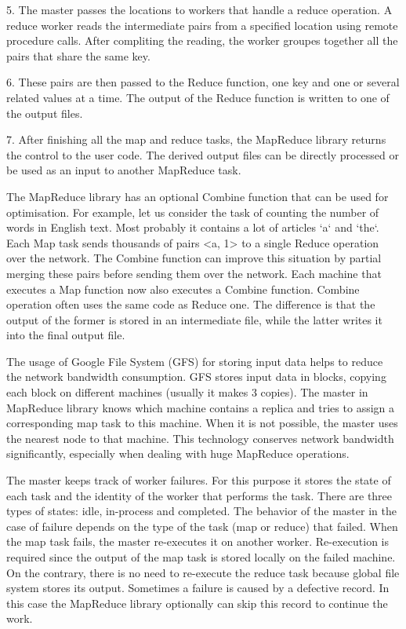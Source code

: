 5. The master passes the locations to workers that handle a reduce operation.
A reduce worker reads the intermediate pairs from a specified location using remote procedure calls.
After compliting the reading, the worker groupes together all the pairs that share the same key.

6. These pairs are then passed to the Reduce function, one key and one or several related values at a time.
The output of the Reduce function is written to one of the output files.

7. After finishing all the map and reduce tasks, the MapReduce library returns the control to the user code.
The derived output files can be directly processed or be used as an input to another MapReduce task.

The MapReduce library has an optional Combine function that can be used for optimisation.
For example, let us consider the task of counting the number of words in English text.
Most probably it contains a lot of articles `a` and `the`.
Each Map task sends thousands of pairs <a, 1> to a single Reduce operation over the network. 
The Combine function can improve this situation by partial merging these pairs before sending them over the network.
Each machine that executes a Map function now also executes a Combine function.
Combine operation often uses the same code as Reduce one.
The difference is that the output of the former is stored in an intermediate file, while the latter writes it into the final output file.

The usage of Google File System (GFS) for storing input data helps to reduce the network bandwidth consumption.
GFS stores input data in blocks, copying each block on different machines (usually it makes 3 copies).
The master in MapReduce library knows which machine contains a replica and tries to assign a corresponding map task to this machine.   
When it is not possible, the master uses the nearest node to that machine.
This technology conserves network bandwidth significantly, especially when dealing with huge MapReduce operations.
 
The master keeps track of worker failures.
For this purpose it stores the state of each task and the identity of the worker that performs the task.
There are three types of states: idle, in-process and completed.
The behavior of the master in the case of failure depends on the type of the task (map or reduce) that failed.
When the map task fails, the master re-executes it on another worker.
Re-execution is required since the output of the map task is stored locally on the failed machine.
On the contrary, there is no need to re-execute the reduce task because global file system stores its output.
Sometimes a failure is caused by a defective record.
In this case the MapReduce library optionally can skip this record to continue the work. 
 
